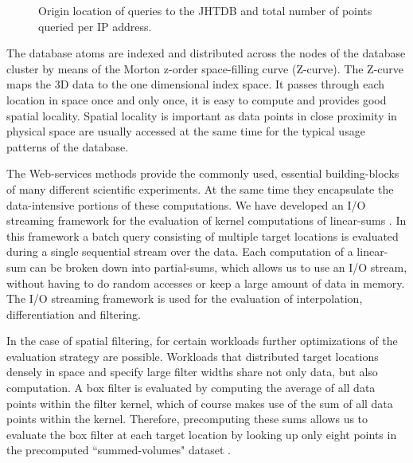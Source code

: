\documentclass[10pt,twocolumn]{article}
\begin{document}
\begin{figure}
\caption{Origin location of queries to the JHTDB and total number of points queried per IP address.}
\label{fig:ip_map}
\end{figure}

The database atoms are indexed and distributed across the nodes of the database cluster by means of the Morton z-order space-filling curve (Z-curve). The 
Z-curve maps the 3D data to the one dimensional index space. It passes through each location in space once and only once, it is easy to compute and
provides good spatial locality. Spatial locality is important as data points in close proximity in physical space are usually accessed at the same time for the
typical usage patterns of the database.

The Web-services methods provide the commonly used, essential building-blocks of many different scientific experiments. At the same time they
encapsulate the data-intensive portions of these computations. We have developed an I/O streaming framework for the evaluation of kernel computations of
linear-sums \cite{KanovSC11}. In this framework a batch query consisting of multiple target locations is evaluated during a single sequential stream over 
the data. Each computation of a linear-sum can be broken down into partial-sums, which allows us to use an I/O stream, without having to do random 
accesses or keep a large amount of data in memory. The I/O streaming framework is used for the evaluation of interpolation, differentiation and filtering.

In the case of spatial filtering, for certain workloads further optimizations of the evaluation strategy are possible. Workloads that distributed target locations
densely in space and specify large filter widths share not only data, but also computation. A box filter is evaluated by computing the average of all data
points within the filter kernel, which of course makes use of the sum of all data points within the kernel. Therefore, precomputing these sums allows us to
evaluate the box filter at each target location by looking up only eight points in the precomputed ``summed-volumes" dataset \cite{KanovSC12}.
\end{document}
